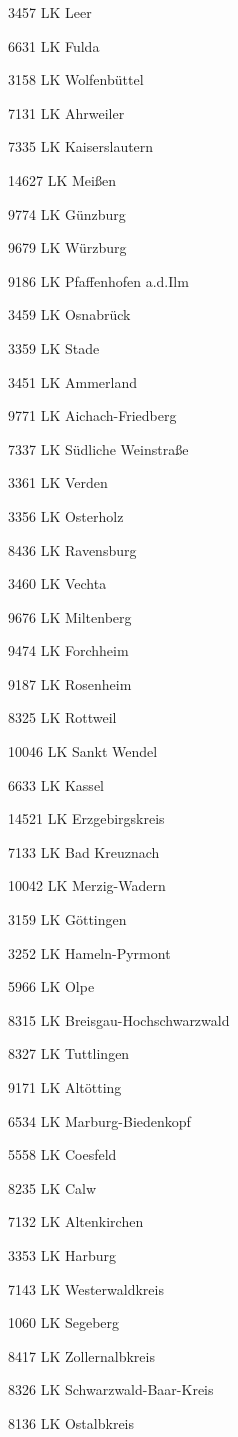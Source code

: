 3457  LK Leer

6631  LK Fulda

3158  LK Wolfenbüttel

7131  LK Ahrweiler

7335  LK Kaiserslautern

14627  LK Meißen

9774  LK Günzburg

9679  LK Würzburg

9186  LK Pfaffenhofen a.d.Ilm

3459  LK Osnabrück

3359  LK Stade

3451  LK Ammerland

9771  LK Aichach-Friedberg

7337  LK Südliche Weinstraße

3361  LK Verden

3356  LK Osterholz

8436  LK Ravensburg

3460  LK Vechta

9676  LK Miltenberg

9474  LK Forchheim

9187  LK Rosenheim

8325  LK Rottweil

10046  LK Sankt Wendel

6633  LK Kassel

14521  LK Erzgebirgskreis

7133  LK Bad Kreuznach

10042  LK Merzig-Wadern

3159  LK Göttingen

3252  LK Hameln-Pyrmont

5966  LK Olpe

8315  LK Breisgau-Hochschwarzwald

8327  LK Tuttlingen

9171  LK Altötting

6534  LK Marburg-Biedenkopf

5558  LK Coesfeld

8235  LK Calw

7132  LK Altenkirchen

3353  LK Harburg

7143  LK Westerwaldkreis

1060  LK Segeberg

8417  LK Zollernalbkreis

8326  LK Schwarzwald-Baar-Kreis

8136  LK Ostalbkreis

